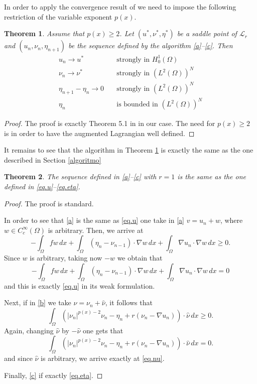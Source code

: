 \documentclass[11pt]{amsart}
\newcommand{\LL}{\mathcal L}
\newtheorem{teo}{Theorem}[section]
\theoremstyle{remark}
\theoremstyle{definition}
\numberwithin{equation}{section}
\begin{document}
In order to apply the convergence result of \cite{Glowinski} we need to impose the following restriction of the variable exponent $p(x)$.
\begin{teo}\label{thm.glowinski}
Assume that $p(x)\ge 2$. Let $(u^*,\nu^*,\eta^*)$ be a saddle point of $\LL_r$ and $(u_n,\nu_n,\eta_{n+1})$ be the sequence defined by the algorithm \eqref{a}--\eqref{c}. Then
\begin{align*}
u_n \to u^* &\quad \text{strongly in } H^1_0(\Omega)\\
\nu_n \to \nu^* &\quad \text{strongly in } (L^2(\Omega))^N\\
\eta_{n+1}-\eta_n \to 0 & \quad \text{strongly in } (L^2(\Omega))^N\\
\eta_n &\quad \text{is bounded in } (L^2(\Omega))^N
\end{align*}
\end{teo}

\begin{proof}
The proof is exactly Theorem 5.1 in \cite[Chapter VI]{Glowinski} in our case. The need for $p(x)\ge 2$ is in order to have the augmented Lagrangian well defined.
\end{proof}
 
It remains to see that the algorithm in Theorem \ref{thm.glowinski} is exactly the same as the one described in Section \ref{algoritmo}


\begin{teo}
The sequence defined in \eqref{a}--\eqref{c} with $r=1$ is the same as the one defined in \eqref{eq.u}--\eqref{eq.eta}.
\end{teo}

\begin{proof}
The proof is standard.

In order to see that \eqref{a} is the same as \eqref{eq.u} one take in \eqref{a} $v=u_n + w$, where $w\in C^\infty_c(\Omega)$ is arbitrary. Then, we arrive at
$$
-\int_\Omega fw\, dx + \int_\Omega (\eta_n -\nu_{n-1}) \cdot\nabla w\, dx + \int_\Omega \nabla u_n\cdot \nabla w \, dx  \ge 0.
$$
Since $w$ is arbitrary, taking now $-w$ we obtain that
$$
-\int_\Omega fw\, dx + \int_\Omega (\eta_n -\nu_{n-1}) \cdot\nabla w\, dx + \int_\Omega \nabla u_n\cdot \nabla w \, dx = 0
$$
and this is exactly \eqref{eq.u} in its weak formulation.

Next, if in \eqref{b} we take $\nu = \nu_n + \hat\nu$, it follows that
$$
\int_\Omega \left(|\nu_n|^{p(x)-2}\nu_n - \eta_n + r(\nu_n - \nabla u_n)\right)\cdot \hat\nu\, dx\ge 0.
$$
Again, changing $\hat\nu$ by $-\hat \nu$ one gets that
$$
\int_\Omega \left(|\nu_n|^{p(x)-2}\nu_n - \eta_n + r(\nu_n - \nabla u_n)\right)\cdot \hat\nu\, dx=0.
$$
and since $\hat \nu$ is arbitrary, we arrive exactly at \eqref{eq.nu}.

Finally, \eqref{c} if exactly \eqref{eq.eta}.
\end{proof}
\end{document}
